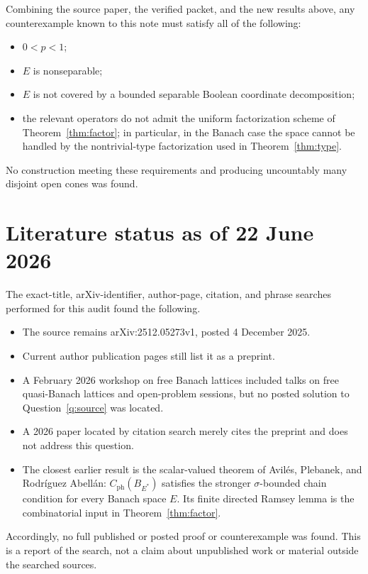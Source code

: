 \documentclass[11pt]{article}
\theoremstyle{definition}
\begin{document}
Combining the source paper, the verified packet, and the new results above, any
counterexample known to this note must satisfy all of the following:
\begin{itemize}
\item $0<p<1$;
\item $E$ is nonseparable;
\item $E$ is not covered by a bounded separable Boolean coordinate decomposition;
\item the relevant operators do not admit the uniform factorization scheme of
Theorem~\ref{thm:factor}; in particular, in the Banach case the space cannot be
handled by the nontrivial-type factorization used in Theorem~\ref{thm:type}.
\end{itemize}
No construction meeting these requirements and producing uncountably many
disjoint open cones was found.

\section{Literature status as of 22 June 2026}

The exact-title, arXiv-identifier, author-page, citation, and phrase searches
performed for this audit found the following.

\begin{itemize}
\item The source remains arXiv:2512.05273v1, posted 4 December 2025.
\item Current author publication pages still list it as a preprint.
\item A February 2026 workshop on free Banach lattices included talks on free
quasi-Banach lattices and open-problem sessions, but no posted solution to
Question~\ref{q:source} was located.
\item A 2026 paper located by citation search merely cites the preprint and does
not address this question.
\item The closest earlier result is the scalar-valued theorem of Avil\'es,
Plebanek, and Rodr\'iguez Abell\'an: $C_{\mathrm{ph}}(B_{E^*})$ satisfies the
stronger $\sigma$-bounded chain condition for every Banach space $E$.  Its
finite directed Ramsey lemma is the combinatorial input in
Theorem~\ref{thm:factor}.
\end{itemize}

Accordingly, no full published or posted proof or counterexample was found.
This is a report of the search, not a claim about unpublished work or material
outside the searched sources.
\end{document}

